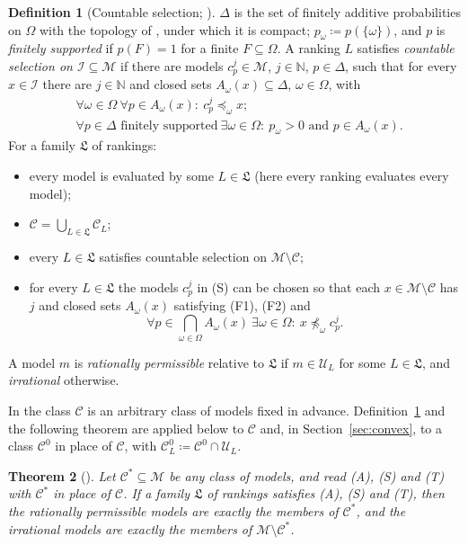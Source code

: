 \documentclass[11pt]{article}
\newtheorem{theorem}{Theorem}[section]
\theoremstyle{definition}
\newtheorem{definition}[theorem]{Definition}
\newcommand{\M}{\mathcal M}
\newcommand{\C}{\mathcal C}
\newcommand{\U}{\mathcal U}
\newcommand{\Lf}{\mathfrak L}
\newcommand{\N}{\mathbb N}
\begin{document}
\begin{definition}[Countable selection; {\cite[Definitions~3.4 and~4.3]{LDG}}]\label{def:selection}
$\Delta$ is the set of finitely additive probabilities on $\Omega$ with the topology of \cite{LDG}, under which it is compact; $p_\omega\coloneqq p(\{\omega\})$, and $p$ is \emph{finitely supported} if $p(F)=1$ for a finite $F\subseteq\Omega$. A ranking $L$ satisfies \emph{countable selection on $\mathcal I\subseteq\M$} if there are models $c^j_p\in\M$, $j\in\N$, $p\in\Delta$, such that for every $x\in\mathcal I$ there are $j\in\N$ and closed sets $A_\omega(x)\subseteq\Delta$, $\omega\in\Omega$, with
\begin{align}
&\forall\omega\in\Omega\ \forall p\in A_\omega(x):\ c^j_p\preceq_\omega x;\tag{F1}\\
&\forall p\in\Delta\text{ finitely supported}\ \exists\omega\in\Omega:\ p_\omega>0\text{ and }p\in A_\omega(x).\tag{F2}
\end{align}
For a family $\Lf$ of rankings:
\begin{itemize}[leftmargin=3em]
\item[(E)] every model is evaluated by some $L\in\Lf$ (here every ranking evaluates every model);
\item[(A)] $\C=\bigcup_{L\in\Lf}\C_L$;
\item[(S)] every $L\in\Lf$ satisfies countable selection on $\M\setminus\C$;
\item[(T)] for every $L\in\Lf$ the models $c^j_p$ in (S) can be chosen so that each $x\in\M\setminus\C$ has $j$ and closed sets $A_\omega(x)$ satisfying (F1), (F2) and
\begin{equation}
\forall p\in\textstyle\bigcap_{\omega\in\Omega}A_\omega(x)\ \exists\omega\in\Omega:\ x\not\preceq_\omega c^j_p.\tag{F3}
\end{equation}
\end{itemize}
A model $m$ is \emph{rationally permissible} relative to $\Lf$ if $m\in\U_L$ for some $L\in\Lf$, and \emph{irrational} otherwise.
\end{definition}

In \cite{LDG} the class $\C$ is an arbitrary class of models fixed in advance. Definition~\ref{def:selection} and the following theorem are applied below to $\C$ and, in Section~\ref{sec:convex}, to a class $\C^0$ in place of $\C$, with $\C^0_L\coloneqq\C^0\cap\U_L$.

\begin{theorem}[{\cite[Theorem~4.4(d)]{LDG}}]\label{thm:ldg}
Let $\C^\ast\subseteq\M$ be any class of models, and read (A), (S) and (T) with $\C^\ast$ in place of $\C$. If a family $\Lf$ of rankings satisfies (A), (S) and (T), then the rationally permissible models are exactly the members of $\C^\ast$, and the irrational models are exactly the members of $\M\setminus\C^\ast$.
\end{theorem}
\end{document}
